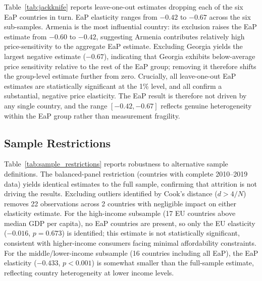 \documentclass[preprint,review,12pt,authoryear]{styles/elsarticle}
\begin{document}
Table~\ref{tab:jackknife} reports leave-one-out estimates dropping each of the six
EaP countries in turn. EaP elasticity ranges from $-0.42$ to $-0.67$ across the six
sub-samples. Armenia is the most influential country: its exclusion raises the EaP
estimate from $-0.60$ to $-0.42$, suggesting Armenia contributes relatively high
price-sensitivity to the aggregate EaP estimate. Excluding Georgia yields the largest
negative estimate ($-0.67$), indicating that Georgia exhibits below-average price
sensitivity relative to the rest of the EaP group; removing it therefore shifts the
group-level estimate further from zero. Crucially, all leave-one-out EaP estimates are
statistically significant at the 1\% level, and all confirm a substantial, negative price
elasticity. The EaP result is therefore not driven by any single country, and the range
$[-0.42, -0.67]$ reflects genuine heterogeneity within the EaP group rather than
measurement fragility.


\clearpage

\subsection{Sample Restrictions}

Table~\ref{tab:sample_restrictions} reports robustness to alternative sample
definitions. The balanced-panel restriction (countries with complete 2010--2019 data)
yields identical estimates to the full sample, confirming that attrition is not driving
the results. Excluding outliers identified by Cook's distance ($d > 4/N$) removes 22
observations across 2 countries with negligible impact on either elasticity estimate.
For the high-income subsample (17 EU countries above median GDP per capita), no EaP
countries are present, so only the EU elasticity ($-0.016$, $p=0.673$) is identified;
this estimate is not statistically significant, consistent with higher-income consumers
facing minimal affordability constraints. For the middle/lower-income subsample
(16 countries including all EaP), the EaP elasticity ($-0.433$, $p<0.001$) is somewhat
smaller than the full-sample estimate, reflecting country heterogeneity at lower income
levels.


\end{document}
